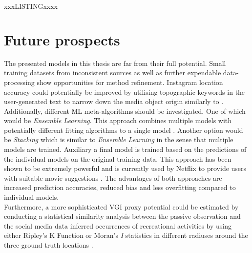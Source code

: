 xxxLISTINGxxxx

\section{Future prospects} \label{future_prospects}
The presented models in this thesis are far from their full potential. Small training datasets from inconsistent sources as well as further expendable data-processing show opportunities for method refinement. Instagram location accuracy could potentially be improved by utilising topographic keywords in the user-generated text to narrow down the media object origin similarly to \parencite{Ostermann2015}. \\
Additionally, different ML meta-algorithms should be investigated. One of which would be \textit{Ensemble Learning}. This approach combines multiple models with potentially different fitting algorithms to a single model \parencite{Zhou2009}. Another option would be \textit{Stacking} which is similar to \textit{Ensemble Learning} in the sense that multiple models are trained. Auxiliary a final model is trained based on the predictions of the individual models on the original training data. This approach has been shown to be extremely powerful and is currently used by Netflix to provide users with suitable movie suggestions \parencite{AndreasToscher2009}. The advantages of both approaches are increased prediction accuracies, reduced bias and less overfitting compared to individual models. \\
Furthermore, a more sophisticated VGI proxy potential could be estimated by conducting a statistical similarity analysis between the passive observation and the social media data inferred occurrences of recreational activities by using either Ripley's K Function or Moran's \textit{I} statistics in different radiuses around the three ground truth locations \parencite{OSullivan2003}.



